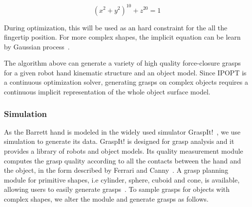 \begin{equation}
{\left(x^2+y^2\right)}^{10}+z^{20} = 1
 \label{equ:cylinder}
\end{equation}

During optimization, this will be used as an hard constraint for the all the fingertip position.
For more complex shapes, the implicit equation can be learn by Gaussian process~\citep{el2013generation}.

The algorithm above can generate a variety of high quality force-closure grasps for a given robot hand kinematic structure and an object model. Since IPOPT is a continuous optimization solver, generating grasps on complex objects requires a continuous implicit representation of the whole object surface model.




\subsubsection{Simulation}
As the Barrett hand is modeled in the widely used simulator GraspIt!~\citep{miller2004graspit}, we use simulation to generate its data. GraspIt! is designed for grasp analysis and it provides a library of robots and object models. Its quality measurement module computes the grasp quality according to all the contacts between the hand and the object, in the form described by Ferrari and Canny~\citep{ferrari1992planning}. A grasp planning module for primitive shapes, i.e cylinder, sphere, cuboid and cone, is available, allowing users to easily generate grasps~\citep{miller2003automatic}.
To sample grasps for objects with complex shapes, we alter the module and generate grasps as follows.


